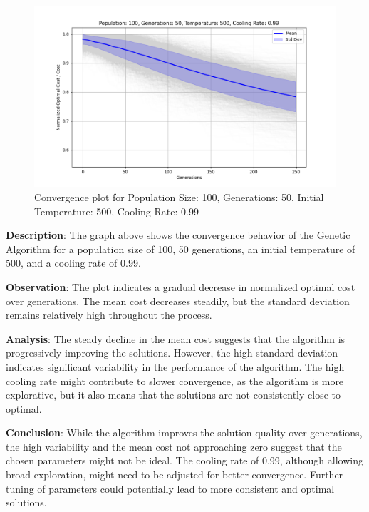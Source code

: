 \documentclass[
]{article}
\begin{document}
    \begin{figure}[H]
        \centering
        \includegraphics[width=\textwidth]{genetic_simulated_annealing_hybrid/Population_100_Generations_50_Temperature_500_CoolingRate_0.99}
        \caption{Convergence plot for Population Size: 100, Generations: 50, Initial Temperature: 500, Cooling Rate: 0.99}
        \label{fig:pop100_gen50_temp500_cr0.99}
    \end{figure}

    \textbf{Description}: The graph above shows the convergence behavior of the Genetic Algorithm for a population size of 100, 50 generations, an initial temperature of 500, and a cooling rate of 0.99.

    \textbf{Observation}: The plot indicates a gradual decrease in normalized optimal cost over generations. The mean cost decreases steadily, but the standard deviation remains relatively high throughout the process.

    \textbf{Analysis}: The steady decline in the mean cost suggests that the algorithm is progressively improving the solutions. However, the high standard deviation indicates significant variability in the performance of the algorithm. The high cooling rate might contribute to slower convergence, as the algorithm is more explorative, but it also means that the solutions are not consistently close to optimal.

    \textbf{Conclusion}: While the algorithm improves the solution quality over generations, the high variability and the mean cost not approaching zero suggest that the chosen parameters might not be ideal. The cooling rate of 0.99, although allowing broad exploration, might need to be adjusted for better convergence. Further tuning of parameters could potentially lead to more consistent and optimal solutions.
\end{document}
